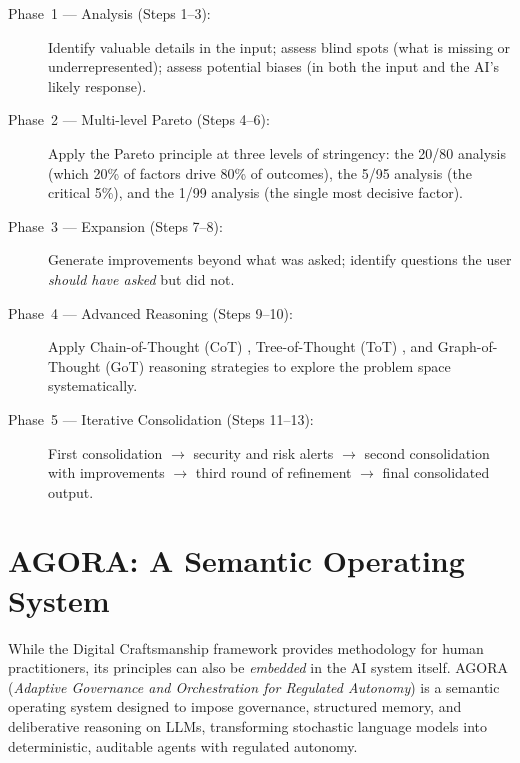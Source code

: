 \documentclass[11pt,a4paper]{article}
\begin{document}
\begin{description}
    \item[Phase~1 --- Analysis (Steps 1--3):] Identify valuable details in the input; assess blind spots (what is missing or underrepresented); assess potential biases (in both the input and the AI's likely response).

    \item[Phase~2 --- Multi-level Pareto (Steps 4--6):] Apply the Pareto principle at three levels of stringency: the 20/80 analysis (which 20\% of factors drive 80\% of outcomes), the 5/95 analysis (the critical 5\%), and the 1/99 analysis (the single most decisive factor).

    \item[Phase~3 --- Expansion (Steps 7--8):] Generate improvements beyond what was asked; identify questions the user \emph{should have asked} but did not.

    \item[Phase~4 --- Advanced Reasoning (Steps 9--10):] Apply Chain-of-Thought (CoT) \citep{wei2022chain}, Tree-of-Thought (ToT) \citep{yao2023tree}, and Graph-of-Thought (GoT) \citep{besta2024graph} reasoning strategies to explore the problem space systematically.

    \item[Phase~5 --- Iterative Consolidation (Steps 11--13):] First consolidation $\rightarrow$ security and risk alerts $\rightarrow$ second consolidation with improvements $\rightarrow$ third round of refinement $\rightarrow$ final consolidated output.
\end{description}

\section{AGORA: A Semantic Operating System}
\label{sec:agora}

While the Digital Craftsmanship framework provides methodology for human practitioners, its principles can also be \emph{embedded} in the AI system itself. AGORA (\emph{Adaptive Governance and Orchestration for Regulated Autonomy}) is a semantic operating system designed to impose governance, structured memory, and deliberative reasoning on LLMs, transforming stochastic language models into deterministic, auditable agents with regulated autonomy.
\end{document}
